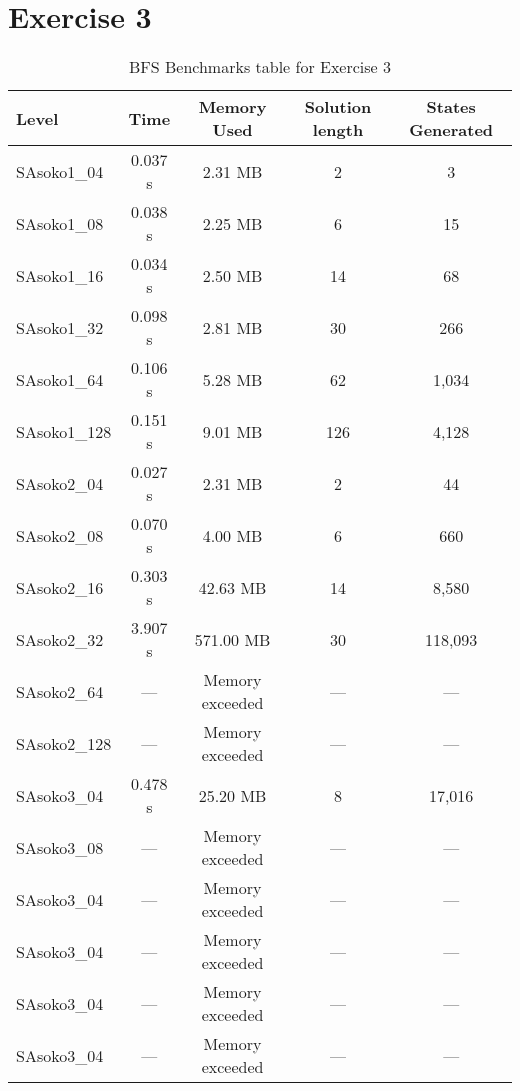 \documentclass[12pt, letterpaper]{article}
\begin{document}
\pagebreak
\section{Exercise 3}

\begin{table}
\centering
\begin{tabular}{|l|c|c|c|c|}
\hline
\textbf{Level} & \textbf{Time} & \textbf{Memory Used} & \textbf{Solution length} & \textbf{States Generated} \\
\hline 
SAsoko1\_04 & 0.037 s & 2.31 MB & 2 & 3 \\
\hline
SAsoko1\_08 & 0.038 s & 2.25 MB & 6 & 15 \\
\hline
SAsoko1\_16 & 0.034 s & 2.50 MB & 14 & 68 \\
\hline
SAsoko1\_32 & 0.098 s & 2.81 MB & 30 & 266 \\
\hline
SAsoko1\_64 & 0.106 s & 5.28 MB & 62 & 1,034 \\
\hline
SAsoko1\_128 & 0.151 s & 9.01 MB & 126 & 4,128 \\
\hline
SAsoko2\_04 & 0.027 s & 2.31 MB & 2 & 44 \\
\hline
SAsoko2\_08 & 0.070 s & 4.00 MB & 6 & 660  \\
\hline
SAsoko2\_16 & 0.303 s & 42.63 MB & 14 & 8,580 \\
\hline
SAsoko2\_32 & 3.907 s & 571.00 MB & 30 & 118,093 \\
\hline
SAsoko2\_64 & --- & Memory exceeded & --- & --- \\
\hline
SAsoko2\_128 & --- & Memory exceeded & --- & --- \\
\hline
SAsoko3\_04  &  0.478 s & 25.20 MB & 8 & 17,016 \\
\hline
SAsoko3\_08 & --- & Memory exceeded & --- & --- \\
\hline
SAsoko3\_04 & --- & Memory exceeded & --- & --- \\
\hline
SAsoko3\_04  & --- & Memory exceeded & --- & --- \\
\hline
SAsoko3\_04  & --- & Memory exceeded & --- & --- \\
\hline
SAsoko3\_04  & --- & Memory exceeded & --- & --- \\
\hline
\end{tabular}
\caption{BFS Benchmarks table for Exercise 3}
\end{table}
\end{document}
